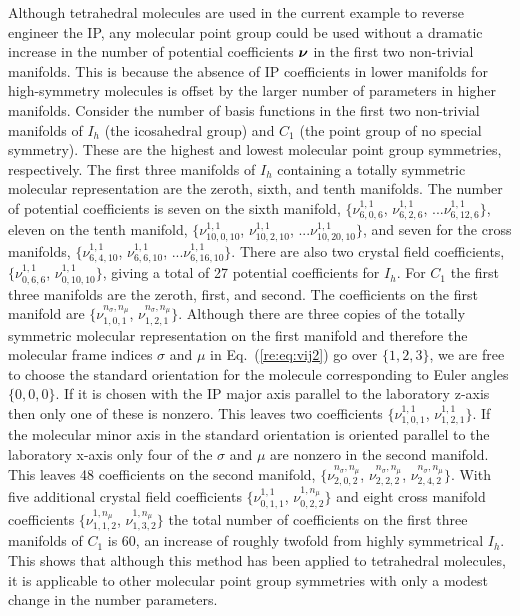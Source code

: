 \documentclass[preprint]{revtex4}
\newcommand{\mb}[1]{\ensuremath{\mbox{\boldmath $ #1 $}}}
\begin{document}
Although tetrahedral molecules are used in the current example to
reverse engineer the IP, any molecular point group could be used
without a dramatic increase in the number of potential coefficients
$\mb{\nu}$ in the first two non-trivial manifolds. This is because
the absence of IP coefficients in lower manifolds for high-symmetry
molecules is offset by the larger number of parameters in higher
manifolds. Consider the number of basis functions in the first two
non-trivial manifolds of $I_h$
(the icosahedral group) %
and $C_1$ (the point group of no special symmetry). These are the
highest and lowest molecular point group symmetries, respectively.
The first three manifolds of $I_h$ containing a totally symmetric
molecular representation are the zeroth, sixth, and tenth manifolds.
The number of potential coefficients is seven on the sixth manifold,
$\{\nu_{6,0,6}^{1,1}$, $\nu_{6,2,6}^{1,1}$,
...$\nu_{6,12,6}^{1,1}\}$, eleven on the tenth manifold,
$\{\nu_{10,0,10}^{1,1}$, $\nu_{10,2,10}^{1,1}$,
...$\nu_{10,20,10}^{1,1}\}$, and seven for the cross manifolds,
$\{\nu_{6,4,10}^{1,1}$, $\nu_{6,6,10}^{1,1}$,
...$\nu_{6,16,10}^{1,1}\}$.  There are also two crystal field
coefficients, $\{\nu_{0,6,6}^{1,1}$, $\nu_{0,10,10}^{1,1}\}$, giving
a total of 27 potential coefficients for $I_h$.  For $C_1$ the first
three manifolds are the zeroth, first, and second. The coefficients
on the first manifold are $\{\nu_{1,0,1}^{n_\sigma,n_\mu}$,
$\nu_{1,2,1}^{n_\sigma,n_\mu}\}$. Although there are three copies of
the totally symmetric molecular representation on the first manifold
and therefore the molecular frame indices $\sigma$ and $\mu$ in
Eq.~(\ref{re:eq:vij2}) go over $\{1,2,3\}$, we are free to choose the
standard orientation for the molecule corresponding to Euler angles
$\{0,0,0\}$.  If it is chosen with the IP major axis parallel to the
laboratory z-axis then only one of these is nonzero. This leaves two
coefficients $\{\nu_{1,0,1}^{1,1}$, $\nu_{1,2,1}^{1,1}\}$. If the
molecular minor axis in the standard orientation is oriented
parallel to the laboratory x-axis only four of the $\sigma$ and
$\mu$ are nonzero in the second manifold. This leaves 48
coefficients on the second manifold,
$\{\nu_{2,0,2}^{n_\sigma,n_\mu}$, $\nu_{2,2,2}^{n_\sigma,n_\mu}$,
$\nu_{2,4,2}^{n_\sigma,n_\mu}\}$. With five additional crystal field
coefficients $\{\nu^{1,1}_{0,1,1}$, $\nu^{1,n_\mu}_{0,2,2}\}$ and
eight cross manifold coefficients $\{\nu^{1,n_\mu}_{1,1,2}$,
$\nu^{1,n_\mu}_{1,3,2}\}$ the total number of coefficients on the
first three manifolds of $C_1$ is 60, an increase of roughly twofold
from highly symmetrical $I_h$. This shows that although this method
has been applied to tetrahedral molecules, it is applicable to other
molecular point group symmetries with only a modest change in the
number parameters.
\end{document}
